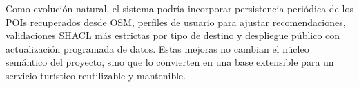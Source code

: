 \documentclass[10pt,a4paper]{article}
\begin{document}
Como evolución natural, el sistema podría incorporar persistencia periódica de los POIs recuperados desde OSM, perfiles de usuario para ajustar recomendaciones, validaciones SHACL más estrictas por tipo de destino y despliegue público con actualización programada de datos. Estas mejoras no cambian el núcleo semántico del proyecto, sino que lo convierten en una base extensible para un servicio turístico reutilizable y mantenible.
\end{document}

